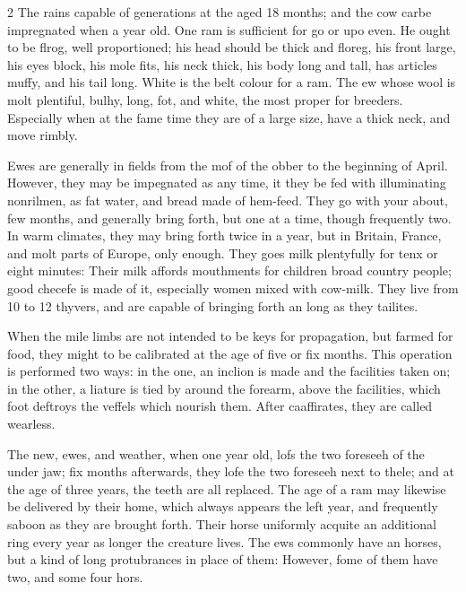 \documentclass[10pt]{article}
\begin{document}
\begin{multicols}{2}
The rains capable of generations at the aged 18 months; and the cow carbe impregnated when a year old. One ram is sufficient for go or upo even. He ought to be flrog, well proportioned; his head should be thick and floreg, his front large, his eyes block, his mole fits, his neck thick, his body long and tall, has articles muffy, and his tail long. White is the belt colour for a ram. The ew whose wool is molt plentiful, bulhy, long, fot, and white, the most proper for breeders. Especially when at the fame time they are of a large size, have a thick neck, and move rimbly.

Ewes are generally in fields from the mof of the obber to the beginning of April. However, they may be impegnated as any time, it they be fed with illuminating nonrilmen, as fat water, and bread made of hem-feed. They go with your about, few months, and generally bring forth, but one at a time, though frequently two. In warm climates, they may bring forth twice in a year, but in Britain, France, and molt parts of Europe, only enough. They goes milk plentyfully for tenx or eight minutes: Their milk affords mouthments for children broad country people; good checefe is made of it, especially women mixed with cow-milk. They live from 10 to 12 thyvers, and are capable of bringing forth an long as they tailites.

When the mile limbs are not intended to be keys for propagation, but farmed for food, they might to be calibrated at the age of five or fix months. This operation is performed two ways: in the one, an inclion is made and the facilities taken on; in the other, a liature is tied by around the forearm, above the facilities, which foot deftroys the veffels which nourish them. After caaffirates, they are called wearless.

The new, ewes, and weather, when one year old, lofs the two foreseeh of the under jaw; fix months afterwards, they lofe the two foreseeh next to thele; and at the age of three years, the teeth are all replaced. The age of a ram may likewise be delivered by their home, which always appears the left year, and frequently saboon as they are brought forth. Their horse uniformly acquite an additional ring every year as longer the creature lives. The ews commonly have an horses, but a kind of long protubrances in place of them: However, fome of them have two, and some four hors.


\end{multicols}
\end{document}
